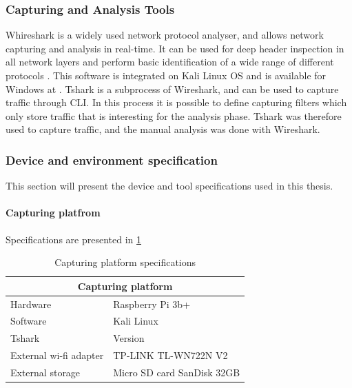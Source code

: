 \subsubsection{Capturing and Analysis Tools}
Whireshark is a widely used network protocol analyser, and allows network capturing and analysis in real-time. It can be used for deep header inspection in all network layers and perform basic identification of a wide range of different protocols \cite{wireshark}. This software is integrated on Kali Linux OS and is available for Windows at \cite{wireshark_download_2016}. Tshark is a subprocess of Wireshark, and can be used to capture traffic through CLI. In this process it is possible to define capturing filters which only store traffic that is interesting for the analysis phase. Tshark was therefore used to capture traffic, and the manual analysis was done with Wireshark.

\subsubsection{Device and environment specification}
This section will present the device and tool specifications used in this thesis.

\paragraph{Capturing platfrom}
Specifications are presented in \ref{tab:CapturingPlatfromSpec}

\begin{table}[H]
\centering
\caption{Capturing platform specifications}
\label{tab:CapturingPlatfromSpec}
\begin{tabular}{|ll|}
\hline
\multicolumn{2}{|c|}{\textbf{Capturing platform}}                         \\ \hline
\multicolumn{1}{|l|}{Hardware}               & Raspberry Pi 3b+           \\ \hline
\multicolumn{1}{|l|}{Software}               & Kali Linux                 \\ \hline
\multicolumn{1}{|l|}{Tshark}                 & Version                    \\ \hline
\multicolumn{1}{|l|}{External wi-fi adapter} & TP-LINK TL-WN722N V2       \\ \hline
\multicolumn{1}{|l|}{External storage}       & Micro SD card SanDisk 32GB \\ \hline
\end{tabular}
\end{table}

